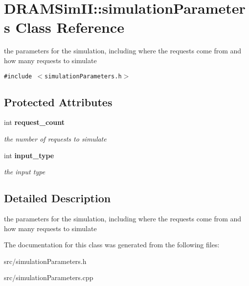 \section{DRAMSimII::simulationParameters Class Reference}
\label{class_d_r_a_m_sim_i_i_1_1simulation_parameters}
the parameters for the simulation, including where the requests come from and how many requests to simulate  


{\tt \#include $<$simulationParameters.h$>$}

\subsection*{Protected Attributes}
\begin{CompactItemize}
\item 
int {\bf request\_\-count}\label{class_d_r_a_m_sim_i_i_1_1simulation_parameters_58f20558fba37b854c90af82640cf9c1}

\begin{CompactList}\small\item\em the number of requests to simulate \item\end{CompactList}\item 
int {\bf input\_\-type}\label{class_d_r_a_m_sim_i_i_1_1simulation_parameters_c24b41d1985f4336f6bb07d92b19bd11}

\begin{CompactList}\small\item\em the input type \item\end{CompactList}\end{CompactItemize}


\subsection{Detailed Description}
the parameters for the simulation, including where the requests come from and how many requests to simulate 

The documentation for this class was generated from the following files:\begin{CompactItemize}
\item 
src/simulationParameters.h\item 
src/simulationParameters.cpp\end{CompactItemize}
